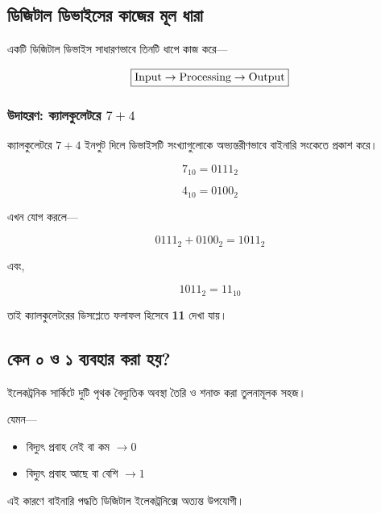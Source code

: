 
\subsection{ডিজিটাল ডিভাইসের কাজের মূল ধারা}

একটি ডিজিটাল ডিভাইস সাধারণভাবে তিনটি ধাপে কাজ করে—

\[
\boxed{
\text{\textenglish{Input}}
\rightarrow
\text{\textenglish{Processing}}
\rightarrow
\text{\textenglish{Output}}
}
\]

\subsubsection*{উদাহরণ: ক্যালকুলেটরে $7+4$}

ক্যালকুলেটরে $7+4$ ইনপুট দিলে ডিভাইসটি সংখ্যাগুলোকে
অভ্যন্তরীণভাবে বাইনারি সংকেতে প্রকাশ করে।

\[
7_{10}=0111_2
\]

\[
4_{10}=0100_2
\]

এখন যোগ করলে—

\[
0111_2+0100_2=1011_2
\]

এবং,

\[
1011_2=11_{10}
\]

তাই ক্যালকুলেটরের ডিসপ্লেতে ফলাফল হিসেবে
\textbf{11} দেখা যায়।


\subsection{কেন ০ ও ১ ব্যবহার করা হয়?}

ইলেকট্রনিক সার্কিটে দুটি পৃথক বৈদ্যুতিক অবস্থা
তৈরি ও শনাক্ত করা তুলনামূলক সহজ।

যেমন—
\begin{itemize}[label={{\bulletfont\textbullet}}, leftmargin=*, nosep]
    \item বিদ্যুৎ প্রবাহ নেই বা কম $\rightarrow 0$
    \item বিদ্যুৎ প্রবাহ আছে বা বেশি $\rightarrow 1$
\end{itemize}

এই কারণে বাইনারি পদ্ধতি ডিজিটাল ইলেকট্রনিক্সে
অত্যন্ত উপযোগী।

\par\begingroup


